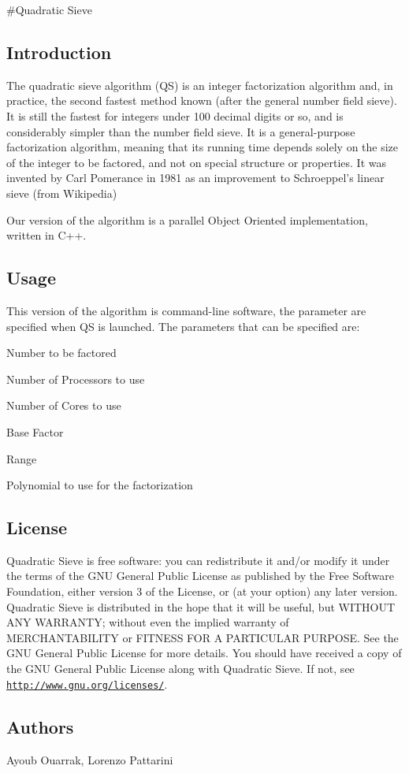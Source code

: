 \#\-Quadratic Sieve

\subsection*{Introduction}

The quadratic sieve algorithm (Q\-S) is an integer factorization algorithm and, in practice, the second fastest method known (after the general number field sieve). It is still the fastest for integers under 100 decimal digits or so, and is considerably simpler than the number field sieve. It is a general-\/purpose factorization algorithm, meaning that its running time depends solely on the size of the integer to be factored, and not on special structure or properties. It was invented by Carl Pomerance in 1981 as an improvement to Schroeppel's linear sieve (from Wikipedia)

Our version of the algorithm is a parallel Object Oriented implementation, written in C++.

\subsection*{Usage}

This version of the algorithm is command-\/line software, the parameter are specified when Q\-S is launched. The parameters that can be specified are\-:
\begin{DoxyItemize}
\item Number to be factored
\item Number of Processors to use
\item Number of Cores to use
\item Base Factor
\item Range
\item Polynomial to use for the factorization
\end{DoxyItemize}

\subsection*{License}

Quadratic Sieve is free software\-: you can redistribute it and/or modify it under the terms of the G\-N\-U General Public License as published by the Free Software Foundation, either version 3 of the License, or (at your option) any later version. Quadratic Sieve is distributed in the hope that it will be useful, but W\-I\-T\-H\-O\-U\-T A\-N\-Y W\-A\-R\-R\-A\-N\-T\-Y; without even the implied warranty of M\-E\-R\-C\-H\-A\-N\-T\-A\-B\-I\-L\-I\-T\-Y or F\-I\-T\-N\-E\-S\-S F\-O\-R A P\-A\-R\-T\-I\-C\-U\-L\-A\-R P\-U\-R\-P\-O\-S\-E. See the G\-N\-U General Public License for more details. You should have received a copy of the G\-N\-U General Public License along with Quadratic Sieve. If not, see \href{http://www.gnu.org/licenses/}{\tt http\-://www.\-gnu.\-org/licenses/}.

\subsection*{Authors}

Ayoub Ouarrak, Lorenzo Pattarini 